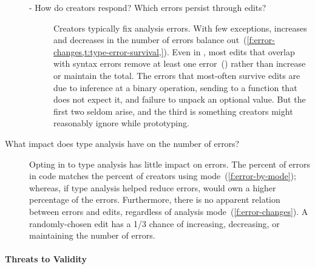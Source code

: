 \documentclass[english,submission,cleveref]{programming}
\begin{document}
\begin{description}
\begin{description}
      \item[- How do creators respond? Which errors persist through edits?]
        Creators typically fix analysis errors.
        With few exceptions, increases and decreases in the number of errors
        balance out~(\cref{f:error-changes,t:type-error-survival,}).
        Even in \mnocheck{}, most edits that overlap with syntax errors
        remove at least one error~() rather than increase or maintain
        the total.
        The errors that most-often survive edits are due to
        inference at a binary operation,
        sending  to a function that does not expect it,
        and failure to unpack an optional value.
        But the first two seldom arise, and the third is something creators
        might reasonably ignore while prototyping.


    \end{description}

  \item[What impact does type analysis have on the number of \FS{} errors?]
    Opting in to type analysis has little impact on \FS{} errors.
    The percent of \FS{} errors in \mnocheck{} code matches the percent of
    creators using \mnocheck{} mode~(\cref{f:error-by-mode}); whereas,
    if type analysis helped reduce \FS{} errors, \mnocheck{} would own a
    higher percentage of the errors.
    Furthermore, there is no apparent relation between \FS{} errors and edits,
    regardless of analysis mode~(\cref{f:error-changes}).
    A randomly-chosen edit has a 1/3 chance of increasing, decreasing, or
    maintaining the number of \FS{} errors.

\end{description}


\paragraph{Threats to Validity}
\label{s:threats}
\end{document}
